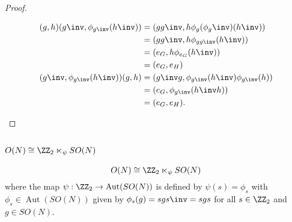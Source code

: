 \documentclass[12pt, a4paper]{article}
\DeclareMathOperator{\aut}{Aut}
\begin{document}
\begin{proof}
\begin{itemize}
        \[\begin{aligned}
            (g,h)(g\inv,\phi_{g\inv}(h\inv)) &= (gg\inv,h\phi_g(\phi_g\inv)(h\inv)) \\
            &=(gg\inv, h\phi_{gg\inv}(h\inv)) \\
            &= (e_G, h\phi_{e_G}(h\inv)) \\
            &= (e_G, e_H) \\
            \vspace{5em}
            (g\inv,\phi_{g\inv}(h\inv))(g,h) &= (g\inv g, \phi_{g\inv}(h\inv)\phi_{g\inv}(h)) \\
            &= (e_G, \phi_{g\inv} (h\inv h)) \\
            &= (e_G,e_H).
        \end{aligned}\]
    \end{itemize}
\end{proof}

\subsection{\texorpdfstring{\(O(N) \cong \ZZ_2 \ltimes_{\psi} SO(N)\)}{TEXT}}

\begin{mdthm}
    \[O(N) \cong \ZZ_2 \ltimes_{\psi} SO(N)\]
    where the map \(\psi:\ZZ_2 \to \aut(SO(N))\) is defined by \(\psi(s)=\phi_s\) with \(\phi_s \in \aut(SO(N))\) given by \(\phi_s(g)=sgs\inv = sgs\) for all \(s \in \ZZ_2\) and \(g\in SO(N)\).
\end{mdthm}
\end{document}
